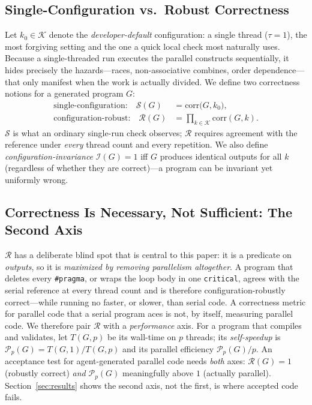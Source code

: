\subsection{Single-Configuration vs.\ Robust Correctness}
Let $k_0\in\mathcal{K}$ denote the \emph{developer-default} configuration: a
single thread ($\tau{=}1$), the most forgiving setting and the one a quick local
check most naturally uses. Because a single-threaded run executes the parallel
constructs sequentially, it hides precisely the hazards---races,
non-associative combines, order dependence---that only manifest when the work is
actually divided. We define two correctness notions for a generated program $G$:
\begin{align}
\text{single-configuration:}\quad \mathcal{S}(G) &= \mathrm{corr}\big(G,k_0\big),\label{eq:S}\\
\text{configuration-robust:}\quad \mathcal{R}(G) &= \!\!\prod_{k\in\mathcal{K}}\!\! \mathrm{corr}(G,k).\label{eq:R}
\end{align}
$\mathcal{S}$ is what an ordinary single-run check observes; $\mathcal{R}$
requires agreement with the reference under \emph{every} thread count and every
repetition. We also define \emph{configuration-invariance} $\mathcal{I}(G)=1$ iff
$G$ produces identical outputs for all $k$ (regardless of whether they are
correct)---a program can be invariant yet uniformly wrong.

\subsection{Correctness Is Necessary, Not Sufficient: The Second Axis}
\label{sec:secondaxis}
$\mathcal{R}$ has a deliberate blind spot that is central to this paper: it is a
predicate on \emph{outputs}, so it is \emph{maximized by removing parallelism
altogether}. A program that deletes every \texttt{\#pragma}, or wraps the loop body
in one \texttt{critical}, agrees with the serial reference at every thread
count and is therefore configuration-robustly correct---while running no faster,
or slower, than serial code. A correctness metric for parallel code that a serial
program aces is not, by itself, measuring parallel code. We therefore pair
$\mathcal{R}$ with a \emph{performance} axis. For a program that compiles and
validates, let $T(G,p)$ be its wall-time on $p$ threads; its \emph{self-speedup}
is $\mathcal{P}_p(G)=T(G,1)/T(G,p)$ and its parallel efficiency
$\mathcal{P}_p(G)/p$. An acceptance test for agent-generated parallel code needs
\emph{both} axes: $\mathcal{R}(G){=}1$ (robustly correct) \emph{and}
$\mathcal{P}_p(G)$ meaningfully above $1$ (actually parallel). Section~\ref{sec:results}
shows the second axis, not the first, is where accepted code fails.

